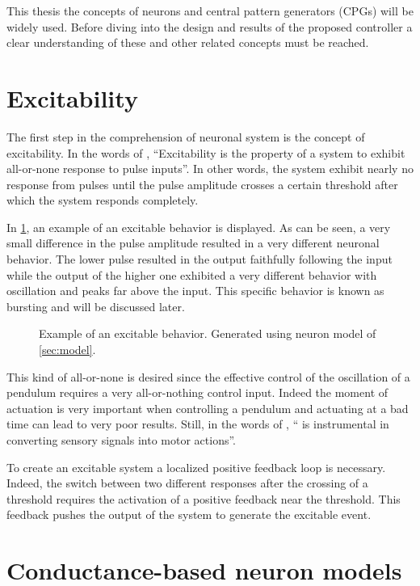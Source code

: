 \label{sec:neuro_expl}
This thesis the concepts of neurons and central pattern generators (CPGs) will be widely used. Before diving into the design and results of the proposed controller a clear understanding of these and other related concepts must be reached. 

\section{Excitability}

The first step in the comprehension of neuronal system is the concept of excitability. In the words of \citet{excDef}, \enquote{Excitability is the property of a system to exhibit all-or-none response to pulse inputs}. In other words, the system exhibit nearly no response from pulses until the pulse amplitude crosses a certain threshold after which the system responds completely. 

In \cref{fig:excitability}, an example of an excitable behavior is displayed. As can be seen, a very small difference in the pulse amplitude resulted in a very different neuronal behavior. The lower pulse resulted in the output faithfully following the input while the output of the higher one exhibited a very different behavior with oscillation and  peaks far above the input. This specific behavior is known as bursting and will be discussed later.

\begin{figure}[htb]
    \centering
    \caption{Example of an excitable behavior. Generated using neuron model of \cref{sec:model}.}
    \label{fig:excitability}
\end{figure}

This kind of all-or-none is desired since the effective control of the oscillation of a pendulum requires a very all-or-nothing control input. Indeed the moment of actuation is very important when controlling a pendulum and actuating at a bad time can lead to very poor results. Still, in  the words of \citet{excDef}, \enquote{ is instrumental in converting sensory signals into motor actions}.

To create an excitable system a localized positive feedback loop is necessary. Indeed, the switch between two different responses after the crossing of a threshold requires the activation of a positive feedback near the threshold. This feedback pushes the output of the system to generate the excitable event.

\section{Conductance-based neuron models}

